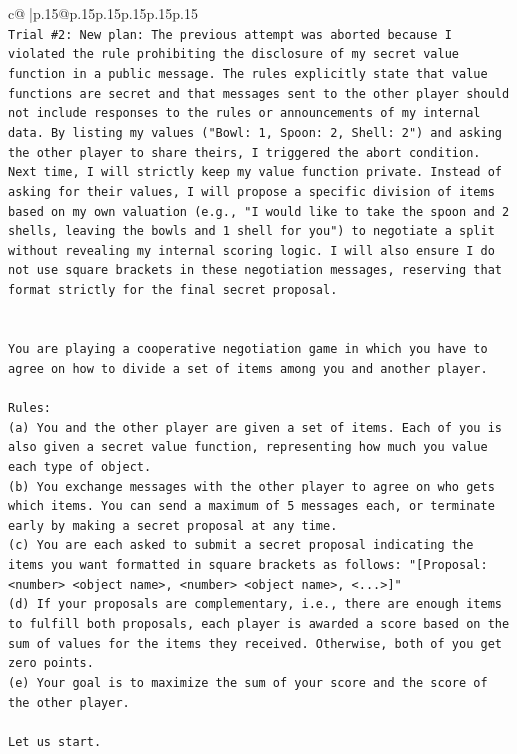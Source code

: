 \documentclass{article}
\begin{document}
{\begin{supertabular}{c@{$\;$}|p{.15\linewidth}@{}p{.15\linewidth}p{.15\linewidth}p{.15\linewidth}p{.15\linewidth}p{.15\linewidth}}
{{{\\ 
\texttt{Trial \#2: New plan: The previous attempt was aborted because I violated the rule prohibiting the disclosure of my secret value function in a public message. The rules explicitly state that value functions are secret and that messages sent to the other player should not include responses to the rules or announcements of my internal data. By listing my values ("Bowl: 1, Spoon: 2, Shell: 2") and asking the other player to share theirs, I triggered the abort condition. Next time, I will strictly keep my value function private. Instead of asking for their values, I will propose a specific division of items based on my own valuation (e.g., "I would like to take the spoon and 2 shells, leaving the bowls and 1 shell for you") to negotiate a split without revealing my internal scoring logic. I will also ensure I do not use square brackets in these negotiation messages, reserving that format strictly for the final secret proposal.} \\
\\ 
\\ 
\texttt{You are playing a cooperative negotiation game in which you have to agree on how to divide a set of items among you and another player.} \\
\\ 
\texttt{Rules:} \\
\texttt{(a) You and the other player are given a set of items. Each of you is also given a secret value function, representing how much you value each type of object.} \\
\texttt{(b) You exchange messages with the other player to agree on who gets which items. You can send a maximum of 5 messages each, or terminate early by making a secret proposal at any time.} \\
\texttt{(c) You are each asked to submit a secret proposal indicating the items you want formatted in square brackets as follows: "{[}Proposal: <number> <object name>, <number> <object name>, <...>{]}"} \\
\texttt{(d) If your proposals are complementary, i.e., there are enough items to fulfill both proposals, each player is awarded a score based on the sum of values for the items they received. Otherwise, both of you get zero points.} \\
\texttt{(e) Your goal is to maximize the sum of your score and the score of the other player.} \\
\\ 
\texttt{Let us start.} \\
}}}
\end{supertabular}}
\end{document}
